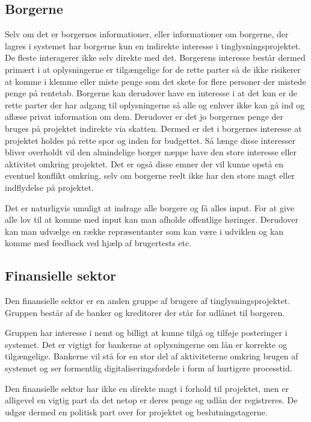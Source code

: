 \documentclass[10pt,a4paper,danish]{article}
\begin{document}
\subsection{Borgerne}
Selv om det er borgernes informationer, eller informationer om borgerne, der lagres i systemet har 
borgerne kun en indirekte interesse i tinglysningsprojektet. De fleste interagerer ikke
selv direkte med det. Borgerens interesse består dermed primært i at
oplysningerne er tilgængelige for de rette parter så de ikke risikerer at komme i
klemme eller miste penge som det skete for flere personer der mistede penge på
rentetab. Borgerne kan derudover have en interesse i at det kun er de rette
parter der har adgang til oplysningerne så alle og enhver ikke kan gå ind og
aflæse privat information om dem.
Derudover er det jo borgernes penge der bruges på projektet indirekte via skatten.
Dermed er det i borgernes interesse at projektet holdes på rette spor og inden
for budgettet.
Så længe disse interesser bliver overholdt vil den almindelige borger næppe
have den store interesse eller aktivitet omkring projektet.
Det er også disse emner der vil kunne opstå en eventuel konflikt omkring, selv
om borgerne reelt ikke har den store magt eller indflydelse på projektet.

Det er naturligvis umuligt at indrage alle borgere og få alles input.
For at give alle lov til at komme med input kan man afholde offentlige
høringer. Derudover kan man udvælge en række repræsentanter som kan være
i udviklen og kan komme med feedback ved hjælp af brugertests etc.

\subsection{Finansielle sektor}

Den finansielle sektor er en anden gruppe af brugere af tinglysningsprojektet.
Gruppen består af de banker og kreditorer der står for udlånet til borgeren.

Gruppen har interesse i nemt og billigt at kunne tilgå og tilføje posteringer i systemet.
Det er vigtigt for bankerne at oplysningerne om lån er korrekte og tilgængelige.
Bankerne vil stå for en stor del af aktiviteterne omkring brugen af systemet og
ser formentlig digitaliseringsfordele i form af hurtigere processtid.

Den finansielle sektor har ikke en direkte magt i forhold til projektet, men er alligevel
en vigtig part da det netop er deres penge og udlån der registreres. De udgør
dermed en politisk part over for projektet og beslutningstagerne.
\end{document}
